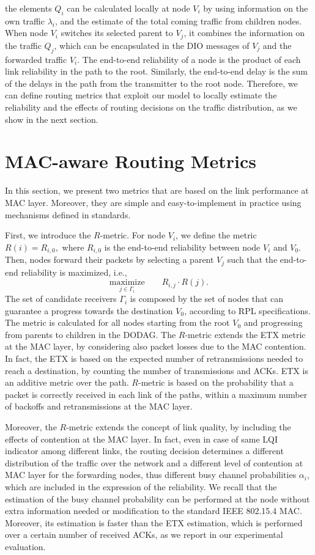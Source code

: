 \documentclass[review, 1p, 11pt]{elsarticle}
\numberwithin{equation}{section}
\begin{document}
the elements $Q_i$ can be calculated locally at node $V_i$ by using information on the own traffic
$\lambda_i$, and the estimate of the total coming traffic from children nodes.
When node $V_i$ switches its selected parent to $V_j$, it combines the information on the
traffic $Q_j$, which can be encapsulated in the DIO messages of $V_j$ and the forwarded traffic $V_i$.
The end-to-end reliability of a
node is the product of each link reliability in the path to the
root. Similarly, the end-to-end delay is the sum of the delays in
the path from the transmitter to the root node.
Therefore, we can define routing metrics that exploit our model to locally estimate the reliability and the effects of routing decisions on the traffic distribution, as we show in the next section.


\section{MAC-aware Routing Metrics} \label{sec:mac-aware}
In this section, we present two metrics that are based on the link performance at MAC layer. Moreover, they are simple and easy-to-implement in practice using mechanisms defined in standards.

First, we introduce the $R$-metric. For node $V_i$, we define the metric $R(i) = R_{i,0},$
where  $R_{i,0}$ is the end-to-end reliability between node $V_i$ and $V_0$.
Then, nodes forward their packets by selecting a parent $V_j$ such that the
end-to-end reliability is maximized, i.e.,
$$\underset{j \in \Gamma_i}{\text{maximize}} \qquad R_{i,j} \cdot R(j).$$
 The set of candidate receivers $\Gamma_i$ is composed by the set of nodes that can guarantee a progress towards the destination $V_0$, according to RPL specifications.
 The metric is calculated for all nodes starting from the root $V_0$ and progressing from parents to children in the DODAG.
The $R$-metric extends the ETX metric at the MAC layer, by considering also packet losses due to the MAC contention.
In fact, the ETX is based on the expected number of retransmissions needed to reach a destination, by counting the number of transmissions and ACKs. ETX is an additive metric over the path. $R$-metric is based on the probability that a packet is correctly received in each link of the paths, within a maximum number of backoffs and retransmissions at the MAC layer.

Moreover, the $R$-metric extends the concept of link quality, by including the effects of contention at the MAC layer. In fact, even in case of same LQI indicator among different links, the routing decision determines a different distribution of the traffic over the network and a different level of contention at MAC layer for the forwarding nodes, thus different busy channel probabilities $\alpha_i$, which are included in the expression of the reliability.
We recall that the estimation of the busy channel probability can be performed at the node without extra information needed or modification to the standard IEEE 802.15.4 MAC. Moreover, its estimation is faster than the ETX estimation, which is performed over a certain number of received ACKs, as we report in our experimental evaluation.
\end{document}
